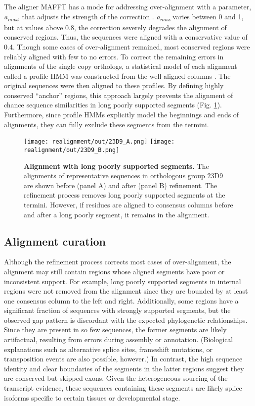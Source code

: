 \documentclass[10pt,letterpaper]{article}
\begin{document}
The aligner MAFFT has a mode for addressing over-alignment with a parameter, \textit{a\textsubscript{max}}, that adjusts the strength of the correction \cite{Katoh2013, Katoh2016}. \textit{a\textsubscript{max}} varies between 0 and 1, but at values above 0.8, the correction severely degrades the alignment of conserved regions. Thus, the sequences were aligned with a conservative value of 0.4. Though some cases of over-alignment remained, most conserved regions were reliably aligned with few to no errors. To correct the remaining errors in alignments of the single copy orthologs, a statistical model of each alignment called a profile HMM was constructed from the well-aligned columns \cite{Eddy2009}. The original sequences were then aligned to these profiles. By defining highly conserved “anchor” regions, this approach largely prevents the alignment of chance sequence similarities in long poorly supported segments (Fig. \ref{fig:realignment}). Furthermore, since profile HMMs explicitly model the beginnings and ends of alignments, they can fully exclude these segments from the termini.

\begin{figure}[h!]
\texttt{[image: realignment/out/23D9\_A.png]}
\texttt{[image: realignment/out/23D9\_B.png]}
\centering
\caption{\textbf{Alignment with long poorly supported segments.}
The alignments of representative sequences in orthologous group 23D9 are shown before (panel A) and after (panel B) refinement. The refinement process removes long poorly supported segments at the termini. However, if residues are aligned to consensus columns before and after a long poorly segment, it remains in the alignment.}
\label{fig:realignment}
\end{figure}

\subsection*{Alignment curation}
Although the refinement process corrects most cases of over-alignment, the alignment may still contain regions whose aligned segments have poor or inconsistent support. For example, long poorly supported segments in internal regions were not removed from the alignment since they are bounded by at least one consensus column to the left and right. Additionally, some regions have a significant fraction of sequences with strongly supported segments, but the observed gap pattern is discordant with the expected phylogenetic relationships. Since they are present in so few sequences, the former segments are likely artifactual, resulting from errors during assembly or annotation. (Biological explanations such as alternative splice sites, frameshift mutations, or transposition events are also possible, however.) In contrast, the high sequence identity and clear boundaries of the segments in the latter regions suggest they are conserved but skipped exons. Given the heterogeneous sourcing of the transcript evidence, these sequences containing these segments are likely splice isoforms specific to certain tissues or developmental stage.
\end{document}
